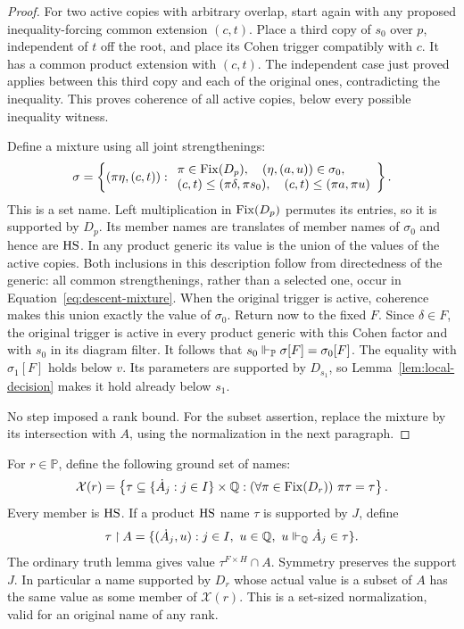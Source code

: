 \begin{proof}
For two active copies with arbitrary overlap, start again with
any proposed inequality-forcing common extension \((c,t)\).
Place a third copy of \(s_0\) over \(p\), independent of \(t\)
off the root, and place its Cohen trigger compatibly with \(c\).
It has a common product extension with \((c,t)\).
The independent case just proved applies between this third copy
and each of the original ones, contradicting the inequality.
This proves coherence of all active copies, below every possible
inequality witness.

Define a mixture using all joint strengthenings:
\begin{equation}\label{eq:descent-mixture}
 \sigma=
 \left\{(\pi\eta,(c,t)):
 \begin{array}{l}
 \pi\in\operatorname{Fix}(D_p),\quad (\eta,(a,u))\in\sigma_0,\\
 (c,t)\leq(\pi\delta,\pi s_0),\quad
 (c,t)\leq(\pi a,\pi u)
 \end{array}\right\}.
\end{equation}
This is a set name.
Left multiplication in \(\operatorname{Fix}(D_p)\) permutes its entries, so it
is supported by \(D_p\).
Its member names are translates of member names of \(\sigma_0\)
and hence are \(\mathrm{HS}\).
In any product generic its value is the union of the values of
the active copies.  Both inclusions in this description follow
from directedness of the generic: all common strengthenings,
rather than a selected one, occur in
Equation~\eqref{eq:descent-mixture}.
When the original trigger is active, coherence makes this union
exactly the value of \(\sigma_0\).
Return now to the fixed \(F\).  Since \(\delta\in F\), the
original trigger is active in every product generic with this Cohen
factor and with \(s_0\) in its diagram filter.  It follows that
\(s_0\Vdash_{\mathbb P}\sigma[F]=\sigma_0[F]\).
The equality with \(\sigma_1[F]\) holds below \(v\).
Its parameters are supported by \(D_{s_1}\), so
Lemma~\ref{lem:local-decision} makes it hold already below \(s_1\).

No step imposed a rank bound.
For the subset assertion, replace the mixture by its intersection
with \(A\), using the normalization in the next paragraph.
\end{proof}

For \(r\in\mathbb P\), define the following ground set of names:
\begin{equation}\label{eq:normalized-local-names}
 \mathcal X(r)=
 \left\{\tau\subseteq
     \{\dot A_j:j\in I\}\times\mathbb Q:
       (\forall\pi\in\operatorname{Fix}(D_r))\ \pi\tau=\tau\right\}.
\end{equation}
Every member is \(\mathrm{HS}\).
If a product \(\mathrm{HS}\) name \(\tau\) is supported by \(J\), define
\[
 \tau\mathbin{\upharpoonright} A=
 \{(\dot A_j,u):j\in I,\ u\in\mathbb Q,\
                         u\Vdash_{\mathbb Q}\dot A_j\in\tau\}.
\]
The ordinary truth lemma gives value \(\tau^{F\times H}\cap A\).
Symmetry preserves the support \(J\).
In particular a name supported by \(D_r\) whose actual value is
a subset of \(A\) has the same value as some member of
\(\mathcal X(r)\).
This is a set-sized normalization, valid for an original name of
any rank.


